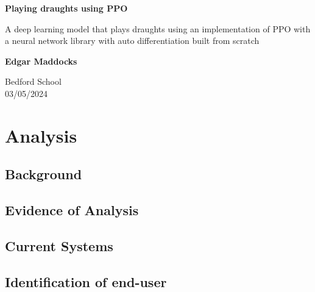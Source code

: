 \documentclass{article}
\begin{document}
\begin{titlepage}
    \begin{center}
        \vspace*{1cm}
            
        \Huge
        \textbf{Playing draughts using PPO}
            
        \vspace{0.5cm}
        \LARGE
        A deep learning model that plays draughts using an implementation of PPO with a neural network library with auto differentiation built from scratch
            
        \vspace{1.5cm}
            
        \textbf{Edgar Maddocks}
            
        \vfill
            
        \vspace{0.8cm}
                        
        \Large
        Bedford School\\
        03/05/2024\\
            
    \end{center}
\end{titlepage}

    \pagebreak

    \tableofcontents

    \section{Analysis}
    \subsection{Background}

    \subsection{Evidence of Analysis}

    \subsection{Current Systems}

    \subsection{Identification of end-user}
\end{document}
